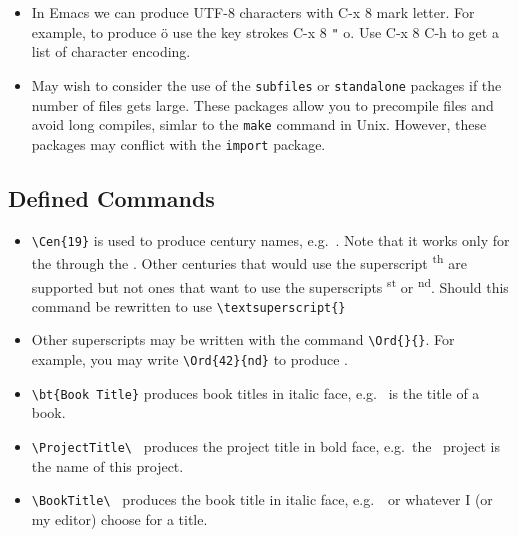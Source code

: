 \begin{itemize}
{  Das astronomische Weltbild gemäß jüngster Forshung.

  But you can still use the standard \LaTeX\ encoding
  
  \verb| Das astronomische Weltbild gem\"{a}{\ss} j\"{u}ngster Forshung|
  to produce the same thing, e.g.

  Das astronomische Weltbild gem\"{a}{\ss} j\"{u}ngster Forshung.

  This will be useful when creating \LaTeXe\ files from the database
  which is in UTF-8 encoding.
}

\item In Emacs we can produce UTF-8 characters with C-x 8 mark letter.
  For example, to produce ö use the key strokes C-x 8 \verb|"| o. Use
  C-x 8 C-h to get a list of character encoding.
  
\item May wish to consider the use of the \texttt{subfiles} or
  \texttt{standalone} packages if the number of files gets
  large. These packages allow you to precompile files and avoid long
  compiles, simlar to the \texttt{make} command in Unix.  However,
  these packages may conflict with the \texttt{import} package.


\end{itemize}

\subsection{Defined Commands}

\begin{itemize}

\item \verb|\Cen{19}| is used to produce century names,
  e.g.\ . Note that it works only for the  through the
  . Other centuries that would use the superscript
  \textsuperscript{th} are supported but not ones that want to use the
  superscripts \textsuperscript{st} or \textsuperscript{nd}.
  Should this command be rewritten to use \verb|\textsuperscript{}|

\item Other superscripts may be written with the command
  \verb|\Ord{}{}|.  For example, you may write \verb|\Ord{42}{nd}| to
  produce .

\item \verb|\bt{Book Title}| produces book titles in italic face,
e.g.\  is the title of a book.

\item \verb|\ProjectTitle\ | produces the project title in bold face,
  e.g.\ the \ProjectTitle\ project is the name of this project.

\item \verb|\BookTitle\ | produces the book title in italic face,
  e.g.\ \BookTitle\ or whatever I (or my editor) choose for a title.

\end{itemize}

